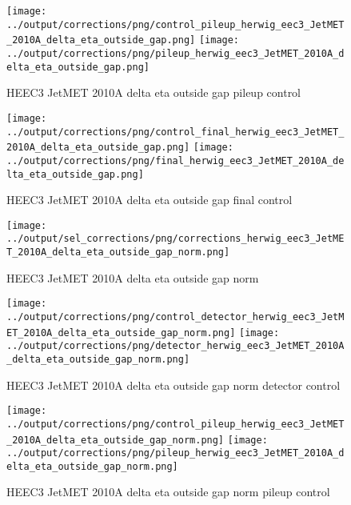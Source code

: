\documentclass[11pt]{book}
\begin{document}
\begin{figure}[ht]
\centering
\texttt{[image: ../output/corrections/png/control\_pileup\_herwig\_eec3\_JetMET\_2010A\_delta\_eta\_outside\_gap.png]}
\texttt{[image: ../output/corrections/png/pileup\_herwig\_eec3\_JetMET\_2010A\_delta\_eta\_outside\_gap.png]}
\caption{HEEC3 JetMET 2010A delta eta outside gap pileup control}
\label{fig:HEEC3_JetMET_2010A_delta_eta_outside_gap_pileup_control}
\end{figure}


\begin{figure}[ht]
\centering
\texttt{[image: ../output/corrections/png/control\_final\_herwig\_eec3\_JetMET\_2010A\_delta\_eta\_outside\_gap.png]}
\texttt{[image: ../output/corrections/png/final\_herwig\_eec3\_JetMET\_2010A\_delta\_eta\_outside\_gap.png]}
\caption{HEEC3 JetMET 2010A delta eta outside gap final control}
\label{fig:HEEC3_JetMET_2010A_delta_eta_outside_gap_final_control}
\end{figure}



\begin{figure}[ht]
\centering
\texttt{[image: ../output/sel\_corrections/png/corrections\_herwig\_eec3\_JetMET\_2010A\_delta\_eta\_outside\_gap\_norm.png]}
\caption{HEEC3 JetMET 2010A delta eta outside gap norm}
\label{fig:HEEC3_JetMET_2010A_delta_eta_outside_gap_norm}
\end{figure}

\begin{figure}[ht]
\centering
\texttt{[image: ../output/corrections/png/control\_detector\_herwig\_eec3\_JetMET\_2010A\_delta\_eta\_outside\_gap\_norm.png]}
\texttt{[image: ../output/corrections/png/detector\_herwig\_eec3\_JetMET\_2010A\_delta\_eta\_outside\_gap\_norm.png]}
\caption{HEEC3 JetMET 2010A delta eta outside gap norm detector control}
\label{fig:HEEC3_JetMET_2010A_delta_eta_outside_gap_norm_detector_control}
\end{figure}

\begin{figure}[ht]
\centering
\texttt{[image: ../output/corrections/png/control\_pileup\_herwig\_eec3\_JetMET\_2010A\_delta\_eta\_outside\_gap\_norm.png]}
\texttt{[image: ../output/corrections/png/pileup\_herwig\_eec3\_JetMET\_2010A\_delta\_eta\_outside\_gap\_norm.png]}
\caption{HEEC3 JetMET 2010A delta eta outside gap norm pileup control}
\label{fig:HEEC3_JetMET_2010A_delta_eta_outside_gap_norm_pileup_control}
\end{figure}
\end{document}
